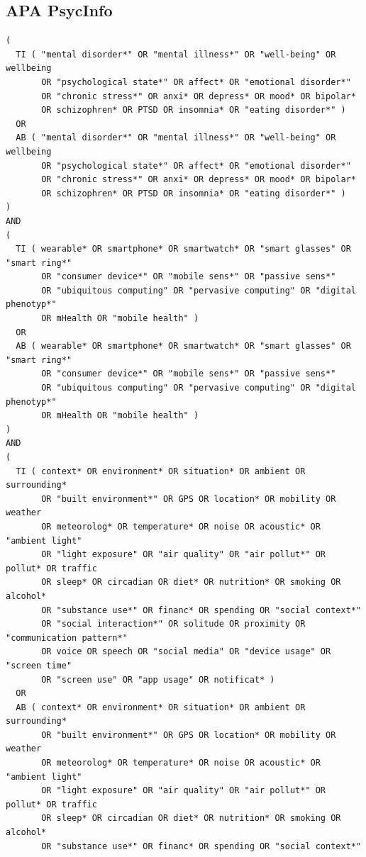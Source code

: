 \subsection{APA PsycInfo}
\begin{lstlisting}[basicstyle=\ttfamily\small, breaklines=true, frame=single]
(
  TI ( "mental disorder*" OR "mental illness*" OR "well-being" OR wellbeing 
       OR "psychological state*" OR affect* OR "emotional disorder*" 
       OR "chronic stress*" OR anxi* OR depress* OR mood* OR bipolar* 
       OR schizophren* OR PTSD OR insomnia* OR "eating disorder*" )
  OR 
  AB ( "mental disorder*" OR "mental illness*" OR "well-being" OR wellbeing 
       OR "psychological state*" OR affect* OR "emotional disorder*" 
       OR "chronic stress*" OR anxi* OR depress* OR mood* OR bipolar* 
       OR schizophren* OR PTSD OR insomnia* OR "eating disorder*" )
)
AND
(
  TI ( wearable* OR smartphone* OR smartwatch* OR "smart glasses" OR "smart ring*" 
       OR "consumer device*" OR "mobile sens*" OR "passive sens*" 
       OR "ubiquitous computing" OR "pervasive computing" OR "digital phenotyp*" 
       OR mHealth OR "mobile health" )
  OR 
  AB ( wearable* OR smartphone* OR smartwatch* OR "smart glasses" OR "smart ring*" 
       OR "consumer device*" OR "mobile sens*" OR "passive sens*" 
       OR "ubiquitous computing" OR "pervasive computing" OR "digital phenotyp*" 
       OR mHealth OR "mobile health" )
)
AND
(
  TI ( context* OR environment* OR situation* OR ambient OR surrounding* 
       OR "built environment*" OR GPS OR location* OR mobility OR weather 
       OR meteorolog* OR temperature* OR noise OR acoustic* OR "ambient light" 
       OR "light exposure" OR "air quality" OR "air pollut*" OR pollut* OR traffic 
       OR sleep* OR circadian OR diet* OR nutrition* OR smoking OR alcohol* 
       OR "substance use*" OR financ* OR spending OR "social context*" 
       OR "social interaction*" OR solitude OR proximity OR "communication pattern*" 
       OR voice OR speech OR "social media" OR "device usage" OR "screen time" 
       OR "screen use" OR "app usage" OR notificat* )
  OR 
  AB ( context* OR environment* OR situation* OR ambient OR surrounding* 
       OR "built environment*" OR GPS OR location* OR mobility OR weather 
       OR meteorolog* OR temperature* OR noise OR acoustic* OR "ambient light" 
       OR "light exposure" OR "air quality" OR "air pollut*" OR pollut* OR traffic 
       OR sleep* OR circadian OR diet* OR nutrition* OR smoking OR alcohol* 
       OR "substance use*" OR financ* OR spending OR "social context*" 

\end{lstlisting}
